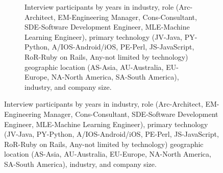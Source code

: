 \begin{figure}[t]
\begin{subfigure}[b]{0.46\textwidth}
\begin{tabular}{p{.4cm}r{.4cm}l{2.5cm}l{2cm}l{2cm}l{2.2cm}r{1.5cm}}
    \bottomrule
    \end{tabular}
    \caption{Interview participants by years in industry, role (Arc-Architect, EM-Engineering Manager, Cons-Consultant, SDE-Software Development Engineer, MLE-Machine Learning Engineer), primary technology (JV-Java, PY-Python, A/IOS-Android/iOS, PE-Perl, JS-JavaScript, RoR-Ruby on Rails, Any-not limited by technology) geographic location (AS-Asia, AU-Australia, EU-Europe, NA-North America, SA-South America), industry, and company size.}
    \label{tab:participants}
    \hfill
\end{subfigure}
\label{fig:profile-dist}
\end{figure}